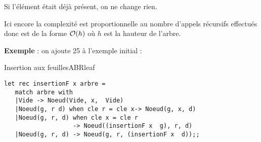 Si l'élément était déjà présent, on ne change rien.

\medskip

Ici encore la complexité est proportionnelle au nombre d'appels récursifs effectués donc est de la forme ${\cal O}(h)$ où $h$ est la hauteur de l'arbre.

{\bf Exemple} : on ajoute 25 à l'exemple initial :

\begin{center}
\end{center}
\begin{code}{Insertion aux feuilles}{ABRleaf}
\begin{lstlisting}
let rec insertionF x arbre = 
   match arbre with
   |Vide -> Noeud(Vide, x,  Vide)
   |Noeud(g, r d) when cle r = cle x-> Noeud(g, x, d)
   |Noeud(g, r, d) when cle x = cle r
                   -> Noeud((insertionF x  g), r, d)
   |Noeud(g, r, d) -> Noeud(g, r, (insertionF x  d));;
\end{lstlisting}
\end{code}






